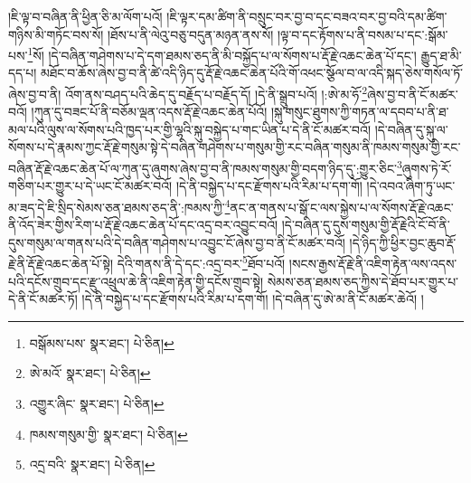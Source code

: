 །ཇི་ལྟ་བ་བཞིན་ནི་ཕྱིན་ཅི་མ་ལོག་པའོ། །ཇི་ལྟར་དམ་ཚིག་ནི་བསྲུང་བར་བྱ་བ་དང་བཟའ་བར་བྱ་བའི་དམ་ཚིག་གཉིས་མི་གཏོང་བས་སོ། །ཐོས་པ་ནི་ལེའུ་བཅུ་བདུན་མཉན་ནས་སོ། །ལྟ་བ་དང་རྟོགས་པ་ནི་བསམ་པ་དང་:སྒོམ་པས་\footnote{བསྒོམས་པས་  སྣར་ཐང་།  པེ་ཅིན། }སོ། །དེ་བཞིན་གཤེགས་པ་དེ་དག་ཐམས་ཅད་ནི་མི་བསྐྱོད་པ་ལ་སོགས་པ་རྡོ་རྗེ་འཆང་ཆེན་པོ་དང་། རྒྱུད་ཐ་མི་དད་པ། མཐོང་བ་ཆོས་ཞེས་བྱ་བ་ནི་ཚེ་འདི་ཉིད་དུ་རྡོ་རྗེ་འཆང་ཆེན་པོའི་གོ་འཕང་སྩོལ་བ་ལ་འདི་སྐད་ཅེས་གསོལ་ཏོ་ཞེས་བྱ་བ་ནི། འོག་ནས་བཤད་པའི་ཆེད་དུ་བརྗོད་པ་བརྗོད་དོ། །དེ་ནི་སྒྲུབ་པའོ། །:ཨེ་མ་ཧོ་\footnote{ཨེ་མའོ་  སྣར་ཐང་།  པེ་ཅིན། }ཞེས་བྱ་བ་ནི་ངོ་མཚར་བའོ། །ཀུན་དུ་བཟང་པོ་ནི་བཅོམ་ལྡན་འདས་རྡོ་རྗེ་འཆང་ཆེན་པོའོ། །སྐུ་གསུང་ཐུགས་ཀྱི་གཏན་ལ་དབབ་པ་ནི་ཐ་མལ་པའི་ལུས་ལ་སོགས་པའི་ཁྱད་པར་གྱི་ལྷའི་སྐུ་བསྐྱེད་པ་གང་ཡིན་པ་དེ་ནི་ངོ་མཚར་བའོ། །དེ་བཞིན་དུ་སྐུ་ལ་སོགས་པ་དེ་རྣམས་ཀྱང་རྡོ་རྗེ་གསུམ་སྟེ་དེ་བཞིན་གཤེགས་པ་གསུམ་གྱི་རང་བཞིན་གསུམ་ནི་ཁམས་གསུམ་གྱི་རང་བཞིན་རྡོ་རྗེ་འཆང་ཆེན་པོ་ལ་ཀུན་དུ་ཞུགས་ཞེས་བྱ་བ་ནི་ཁམས་གསུམ་གྱི་བདག་ཉིད་དུ་:གྱུར་ཅིང་\footnote{འགྱུར་ཞིང་  སྣར་ཐང་།  པེ་ཅིན། }ཞུགས་ཏེ་རོ་གཅིག་པར་གྱུར་པ་དེ་ཡང་ངོ་མཚར་བའོ། །དེ་ནི་བསྐྱེད་པ་དང་རྫོགས་པའི་རིམ་པ་དག་གོ། །དེ་འབའ་ཞིག་ཏུ་ཡང་མ་ཟད་དེ་ཇི་སྲིད་སེམས་ཅན་ཐམས་ཅད་ནི་:ཁམས་ཀྱི་\footnote{ཁམས་གསུམ་གྱི་  སྣར་ཐང་།  པེ་ཅིན། }ནང་ན་གནས་པ་སྒོ་ང་ལས་སྐྱེས་པ་ལ་སོགས་རྡོ་རྗེ་འཆང་ནི་འོད་ཟེར་གྱིས་རིག་པ་རྡོ་རྗེ་འཆང་ཆེན་པོ་དང་འདྲ་བར་འབྱུང་བའོ། །དེ་བཞིན་དུ་དུས་གསུམ་གྱི་རྡོ་རྗེའི་ངོ་བོ་ནི་དུས་གསུམ་ལ་གནས་པའི་དེ་བཞིན་གཤེགས་པ་འབྱུང་ངོ་ཞེས་བྱ་བ་ནི་ངོ་མཚར་བའོ། །དེ་ཉིད་ཀྱི་ཕྱིར་བྱང་ཆུབ་རྡོ་རྗེ་ནི་རྡོ་རྗེ་འཆང་ཆེན་པོ་སྟེ། དེའི་གནས་ནི་དེ་དང་:འདྲ་བར་\footnote{འདྲ་བའི་  སྣར་ཐང་།  པེ་ཅིན། }ཐོབ་པའོ། །སངས་རྒྱས་རྡོ་རྗེ་ནི་འཇིག་རྟེན་ལས་འདས་པའི་དངོས་གྲུབ་དང་རྫུ་འཕྲུལ་ཆེ་ནི་འཇིག་རྟེན་གྱི་དངོས་གྲུབ་སྟེ། སེམས་ཅན་ཐམས་ཅད་ཀྱིས་དེ་ཐོབ་པར་གྱུར་པ་དེ་ནི་ངོ་མཚར་ཏོ། །དེ་ནི་བསྐྱེད་པ་དང་རྫོགས་པའི་རིམ་པ་དག་གོ། །དེ་བཞིན་དུ་ཨེ་མ་ནི་ངོ་མཚར་ཆེའོ། །
